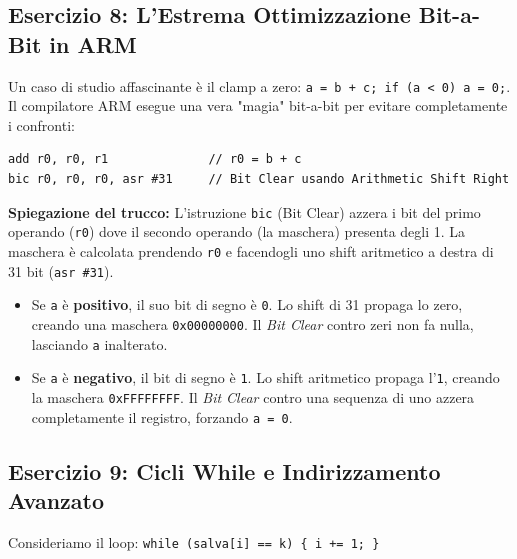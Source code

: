 \documentclass[12pt, a4paper]{article}
\begin{document}
\subsection{Esercizio 8: L'Estrema Ottimizzazione Bit-a-Bit in ARM}
Un caso di studio affascinante è il clamp a zero: \texttt{a = b + c; if (a < 0) a = 0;}.
Il compilatore ARM esegue una vera "magia" bit-a-bit per evitare completamente i confronti:
\begin{verbatim}
add r0, r0, r1              // r0 = b + c 
bic r0, r0, r0, asr #31     // Bit Clear usando Arithmetic Shift Right
\end{verbatim}
\textbf{Spiegazione del trucco:} 
L'istruzione \texttt{bic} (Bit Clear) azzera i bit del primo operando (\texttt{r0}) dove il secondo operando (la maschera) presenta degli 1. La maschera è calcolata prendendo \texttt{r0} e facendogli uno shift aritmetico a destra di 31 bit (\texttt{asr \#31}).
\begin{itemize}
    \item Se \texttt{a} è \textbf{positivo}, il suo bit di segno è \texttt{0}. Lo shift di 31 propaga lo zero, creando una maschera \texttt{0x00000000}. Il \textit{Bit Clear} contro zeri non fa nulla, lasciando \texttt{a} inalterato.
    \item Se \texttt{a} è \textbf{negativo}, il bit di segno è \texttt{1}. Lo shift aritmetico propaga l'\texttt{1}, creando la maschera \texttt{0xFFFFFFFF}. Il \textit{Bit Clear} contro una sequenza di uno azzera completamente il registro, forzando \texttt{a = 0}.
\end{itemize}

\subsection{Esercizio 9: Cicli While e Indirizzamento Avanzato}
Consideriamo il loop: \texttt{while (salva[i] == k) \{ i += 1; \}}
\end{document}
